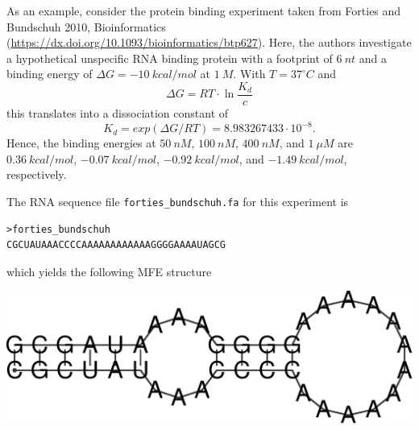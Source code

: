 \documentclass[a4paper]{article}
\begin{document}
As an example, consider the protein binding experiment taken from Forties and Bundschuh 2010,
Bioinformatics (\url{https://dx.doi.org/10.1093/bioinformatics/btp627}). Here, the authors
investigate a hypothetical unspecific RNA binding protein with a footprint of $6~nt$ and
a binding energy of $\Delta G = -10~kcal/mol$ at $1~M$. With $T = 37^\circ C$ and
$$\Delta G = RT \cdot \ln \frac{K_d}{c}$$
this translates into a dissociation constant of
$$K_d = exp(\Delta G / RT) = 8.983267433 \cdot 10^{-8}.$$
Hence, the binding energies at $50~nM$, $100~nM$, $400~nM$, and $1~\mu M$ are $0.36~kcal/mol$,
$-0.07~kcal/mol$, $-0.92~kcal/mol$, and $-1.49~kcal/mol$, respectively.\

The RNA sequence file \texttt{forties\_bundschuh.fa} for this experiment is
\begin{verbatim}
>forties_bundschuh
CGCUAUAAACCCCAAAAAAAAAAAAGGGGAAAAUAGCG
\end{verbatim}
which yields the following MFE structure
\begin{center}
\includegraphics[width=.5\textwidth]{Figures/forties_ss.eps}\\
\end{center}
\end{document}
